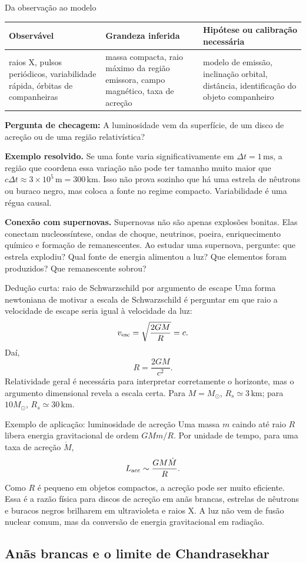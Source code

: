\documentclass[11pt,a4paper]{article}
\newcommand{\observaveis}[4]{%
  \begin{lessonblock}[borderline west={2pt}{0pt}{astroBlue}]{Da observação ao modelo}%
  \begin{tabular}{>{\raggedright\arraybackslash}p{0.27\textwidth}>{\raggedright\arraybackslash}p{0.27\textwidth}>{\raggedright\arraybackslash}p{0.34\textwidth}}
  \toprule
  Observável & Grandeza inferida & Hipótese ou calibração necessária \\
  \midrule
  #1 & #2 & #3 \\
  \bottomrule
  \end{tabular}

  \textbf{Pergunta de checagem:} #4
  \end{lessonblock}
}
\begin{document}
\observaveis{raios X, pulsos periódicos, variabilidade rápida, órbitas de companheiras}{massa compacta, raio máximo da região emissora, campo magnético, taxa de acreção}{modelo de emissão, inclinação orbital, distância, identificação do objeto companheiro}{A luminosidade vem da superfície, de um disco de acreção ou de uma região relativística?}

\textbf{Exemplo resolvido.} Se uma fonte varia significativamente em $\Delta t=1\,\mathrm{ms}$, a região que coordena essa variação não pode ter tamanho muito maior que $c\Delta t\approx3\times10^5\,\mathrm{m}=300\,\mathrm{km}$. Isso não prova sozinho que há uma estrela de nêutrons ou buraco negro, mas coloca a fonte no regime compacto. Variabilidade é uma régua causal.

\textbf{Conexão com supernovas.} Supernovas não são apenas explosões bonitas. Elas conectam nucleossíntese, ondas de choque, neutrinos, poeira, enriquecimento químico e formação de remanescentes. Ao estudar uma supernova, pergunte: que estrela explodiu? Qual fonte de energia alimentou a luz? Que elementos foram produzidos? Que remanescente sobrou?

\begin{lessonblock}[borderline west={2pt}{0pt}{astroGold}]{Dedução curta: raio de Schwarzschild por argumento de escape}
Uma forma newtoniana de motivar a escala de Schwarzschild é perguntar em que raio a velocidade de escape seria igual à velocidade da luz:
\[
v_{\rm esc}=\sqrt{\frac{2GM}{R}}=c.
\]
Daí,
\[
R=\frac{2GM}{c^2}.
\]
Relatividade geral é necessária para interpretar corretamente o horizonte, mas o argumento dimensional revela a escala certa. Para $M=M_\odot$, $R_s\simeq3\,\mathrm{km}$; para $10M_\odot$, $R_s\simeq30\,\mathrm{km}$.
\end{lessonblock}

\begin{lessonblock}{Exemplo de aplicação: luminosidade de acreção}
Uma massa $m$ caindo até raio $R$ libera energia gravitacional de ordem $GMm/R$. Por unidade de tempo, para uma taxa de acreção $\dot M$,
\[
L_{\rm acc}\sim\frac{GM\dot M}{R}.
\]
Como $R$ é pequeno em objetos compactos, a acreção pode ser muito eficiente. Essa é a razão física para discos de acreção em anãs brancas, estrelas de nêutrons e buracos negros brilharem em ultravioleta e raios X. A luz não vem de fusão nuclear comum, mas da conversão de energia gravitacional em radiação.
\end{lessonblock}
\subsection*{Anãs brancas e o limite de Chandrasekhar}
\end{document}
